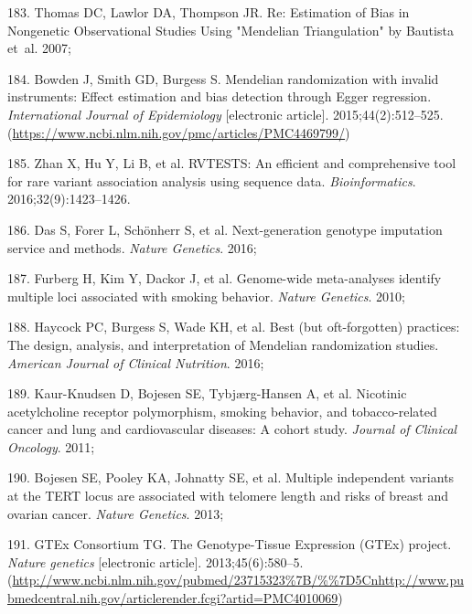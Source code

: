 \documentclass[11pt,oneside]{bristolthesis}
\newenvironment{cslreferences}%
  {}%
  {\par}
\begin{document}
\begin{cslreferences}
\leavevmode\hypertarget{ref-Thomas2007}{}%
183. Thomas DC, Lawlor DA, Thompson JR. Re: Estimation of Bias in Nongenetic Observational Studies Using "Mendelian Triangulation" by Bautista et~al. 2007;

\leavevmode\hypertarget{ref-Bowden2015}{}%
184. Bowden J, Smith GD, Burgess S. Mendelian randomization with invalid instruments: Effect estimation and bias detection through Egger regression. \emph{International Journal of Epidemiology} {[}electronic article{]}. 2015;44(2):512--525. (\url{https://www.ncbi.nlm.nih.gov/pmc/articles/PMC4469799/})

\leavevmode\hypertarget{ref-Zhan2016}{}%
185. Zhan X, Hu Y, Li B, et al. RVTESTS: An efficient and comprehensive tool for rare variant association analysis using sequence data. \emph{Bioinformatics}. 2016;32(9):1423--1426.

\leavevmode\hypertarget{ref-Das2016}{}%
186. Das S, Forer L, Schönherr S, et al. Next-generation genotype imputation service and methods. \emph{Nature Genetics}. 2016;

\leavevmode\hypertarget{ref-Furberg2010}{}%
187. Furberg H, Kim Y, Dackor J, et al. Genome-wide meta-analyses identify multiple loci associated with smoking behavior. \emph{Nature Genetics}. 2010;

\leavevmode\hypertarget{ref-Haycock2016}{}%
188. Haycock PC, Burgess S, Wade KH, et al. Best (but oft-forgotten) practices: The design, analysis, and interpretation of Mendelian randomization studies. \emph{American Journal of Clinical Nutrition}. 2016;

\leavevmode\hypertarget{ref-Kaur-Knudsen2011}{}%
189. Kaur-Knudsen D, Bojesen SE, Tybjærg-Hansen A, et al. Nicotinic acetylcholine receptor polymorphism, smoking behavior, and tobacco-related cancer and lung and cardiovascular diseases: A cohort study. \emph{Journal of Clinical Oncology}. 2011;

\leavevmode\hypertarget{ref-Bojesen2013}{}%
190. Bojesen SE, Pooley KA, Johnatty SE, et al. Multiple independent variants at the TERT locus are associated with telomere length and risks of breast and ovarian cancer. \emph{Nature Genetics}. 2013;

\leavevmode\hypertarget{ref-GTExConsortium2013}{}%
191. GTEx Consortium TG. The Genotype-Tissue Expression (GTEx) project. \emph{Nature genetics} {[}electronic article{]}. 2013;45(6):580--5. (\url{http://www.ncbi.nlm.nih.gov/pubmed/23715323\%7B/\%\%7D5Cnhttp://www.pubmedcentral.nih.gov/articlerender.fcgi?artid=PMC4010069})


\end{cslreferences}
\end{document}
